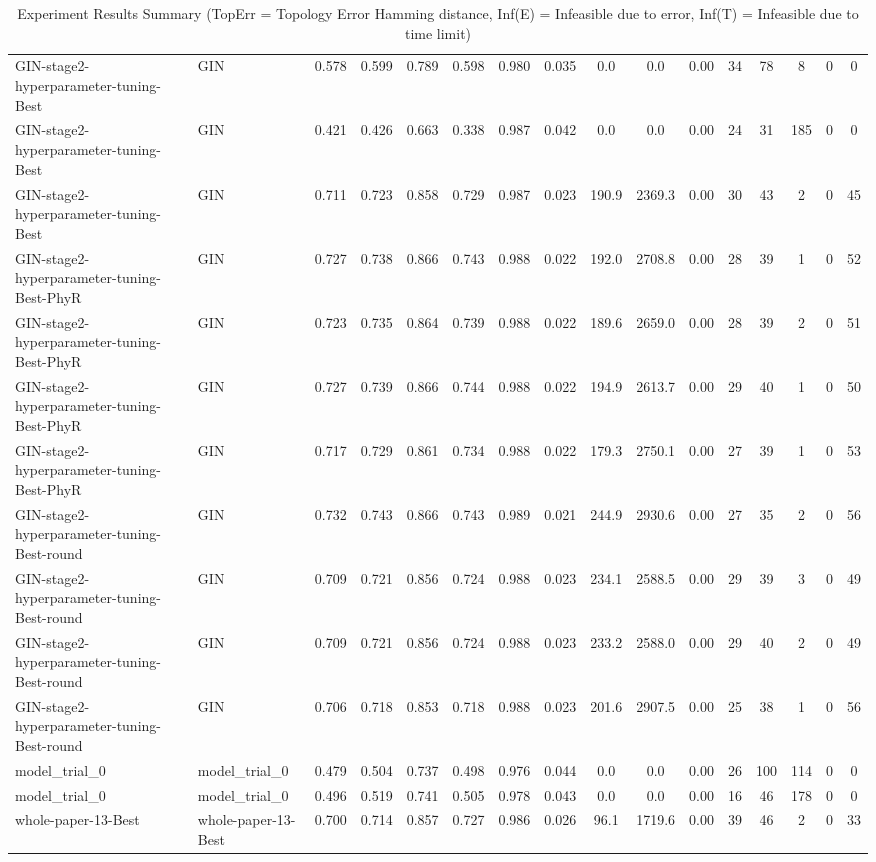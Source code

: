 \begin{table*}[p]
{\begin{tabular}{llcccccccccccccc}
      GIN-stage2-hyperparameter-tuning-Best & GIN & 0.578 & 0.599 & 0.789 & 0.598 & 0.980 & 0.035 & 0.0 & 0.0 & 0.00 & 34 & 78 & 8 & 0 & 0 \\
      GIN-stage2-hyperparameter-tuning-Best & GIN & 0.421 & 0.426 & 0.663 & 0.338 & 0.987 & 0.042 & 0.0 & 0.0 & 0.00 & 24 & 31 & 185 & 0 & 0 \\
      GIN-stage2-hyperparameter-tuning-Best & GIN & 0.711 & 0.723 & 0.858 & 0.729 & 0.987 & 0.023 & 190.9 & 2369.3 & 0.00 & 30 & 43 & 2 & 0 & 45 \\
      GIN-stage2-hyperparameter-tuning-Best-PhyR & GIN & 0.727 & 0.738 & 0.866 & 0.743 & 0.988 & 0.022 & 192.0 & 2708.8 & 0.00 & 28 & 39 & 1 & 0 & 52 \\
      GIN-stage2-hyperparameter-tuning-Best-PhyR & GIN & 0.723 & 0.735 & 0.864 & 0.739 & 0.988 & 0.022 & 189.6 & 2659.0 & 0.00 & 28 & 39 & 2 & 0 & 51 \\
      GIN-stage2-hyperparameter-tuning-Best-PhyR & GIN & 0.727 & 0.739 & 0.866 & 0.744 & 0.988 & 0.022 & 194.9 & 2613.7 & 0.00 & 29 & 40 & 1 & 0 & 50 \\
      GIN-stage2-hyperparameter-tuning-Best-PhyR & GIN & 0.717 & 0.729 & 0.861 & 0.734 & 0.988 & 0.022 & 179.3 & 2750.1 & 0.00 & 27 & 39 & 1 & 0 & 53 \\
      GIN-stage2-hyperparameter-tuning-Best-round & GIN & 0.732 & 0.743 & 0.866 & 0.743 & 0.989 & 0.021 & 244.9 & 2930.6 & 0.00 & 27 & 35 & 2 & 0 & 56 \\
      GIN-stage2-hyperparameter-tuning-Best-round & GIN & 0.709 & 0.721 & 0.856 & 0.724 & 0.988 & 0.023 & 234.1 & 2588.5 & 0.00 & 29 & 39 & 3 & 0 & 49 \\
      GIN-stage2-hyperparameter-tuning-Best-round & GIN & 0.709 & 0.721 & 0.856 & 0.724 & 0.988 & 0.023 & 233.2 & 2588.0 & 0.00 & 29 & 40 & 2 & 0 & 49 \\
      GIN-stage2-hyperparameter-tuning-Best-round & GIN & 0.706 & 0.718 & 0.853 & 0.718 & 0.988 & 0.023 & 201.6 & 2907.5 & 0.00 & 25 & 38 & 1 & 0 & 56 \\
      model_trial_0 & model_trial_0 & 0.479 & 0.504 & 0.737 & 0.498 & 0.976 & 0.044 & 0.0 & 0.0 & 0.00 & 26 & 100 & 114 & 0 & 0 \\
      model_trial_0 & model_trial_0 & 0.496 & 0.519 & 0.741 & 0.505 & 0.978 & 0.043 & 0.0 & 0.0 & 0.00 & 16 & 46 & 178 & 0 & 0 \\
      whole-paper-13-Best & whole-paper-13-Best & 0.700 & 0.714 & 0.857 & 0.727 & 0.986 & 0.026 & 96.1 & 1719.6 & 0.00 & 39 & 46 & 2 & 0 & 33 \\
      \bottomrule
    \end{tabular}%
  }
  \caption{Experiment Results Summary (TopErr = Topology Error Hamming distance, Inf(E) = Infeasible due to error, Inf(T) = Infeasible due to time limit)}
  \label{tab:experiment-results}
\end{table*}